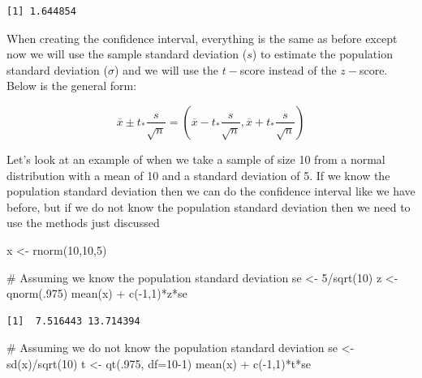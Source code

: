 \documentclass[
  letterpaper,
  DIV=11,
  numbers=noendperiod]{scrreprt}
\newenvironment{Shaded}{\begin{snugshade}}{\end{snugshade}}
\newcommand{\AttributeTok}[1]{\textcolor[rgb]{0.40,0.45,0.13}{#1}}
\newcommand{\CommentTok}[1]{\textcolor[rgb]{0.37,0.37,0.37}{#1}}
\newcommand{\DecValTok}[1]{\textcolor[rgb]{0.68,0.00,0.00}{#1}}
\newcommand{\FunctionTok}[1]{\textcolor[rgb]{0.28,0.35,0.67}{#1}}
\newcommand{\NormalTok}[1]{\textcolor[rgb]{0.00,0.23,0.31}{#1}}
\newcommand{\OtherTok}[1]{\textcolor[rgb]{0.00,0.23,0.31}{#1}}
\newcommand{\SpecialCharTok}[1]{\textcolor[rgb]{0.37,0.37,0.37}{#1}}
\begin{document}
\begin{verbatim}
[1] 1.644854
\end{verbatim}

When creating the confidence interval, everything is the same as before
except now we will use the sample standard deviation (\(s\)) to estimate
the population standard deviation (\(\sigma\)) and we will use the
\(t-\)score instead of the \(z-\)score. Below is the general form:

\[ \overline{x} \pm t_*\frac{s}{\sqrt{n}} = \left(\overline{x} - t_*\frac{s}{\sqrt{n}},\overline{x} + t_*\frac{s}{\sqrt{n}}\right) \]

Let's look at an example of when we take a sample of size 10 from a
normal distribution with a mean of 10 and a standard deviation of 5. If
we know the population standard deviation then we can do the confidence
interval like we have before, but if we do not know the population
standard deviation then we need to use the methods just discussed

\begin{Shaded}
\begin{Highlighting}[]
\NormalTok{x }\OtherTok{\textless{}{-}} \FunctionTok{rnorm}\NormalTok{(}\DecValTok{10}\NormalTok{,}\DecValTok{10}\NormalTok{,}\DecValTok{5}\NormalTok{)}

\CommentTok{\# Assuming we know the population standard deviation}
\NormalTok{se }\OtherTok{\textless{}{-}} \DecValTok{5}\SpecialCharTok{/}\FunctionTok{sqrt}\NormalTok{(}\DecValTok{10}\NormalTok{)}
\NormalTok{z }\OtherTok{\textless{}{-}} \FunctionTok{qnorm}\NormalTok{(.}\DecValTok{975}\NormalTok{)}
\FunctionTok{mean}\NormalTok{(x) }\SpecialCharTok{+} \FunctionTok{c}\NormalTok{(}\SpecialCharTok{{-}}\DecValTok{1}\NormalTok{,}\DecValTok{1}\NormalTok{)}\SpecialCharTok{*}\NormalTok{z}\SpecialCharTok{*}\NormalTok{se}
\end{Highlighting}
\end{Shaded}

\begin{verbatim}
[1]  7.516443 13.714394
\end{verbatim}

\begin{Shaded}
\begin{Highlighting}[]
\CommentTok{\# Assuming we do not know the population standard deviation}
\NormalTok{se }\OtherTok{\textless{}{-}} \FunctionTok{sd}\NormalTok{(x)}\SpecialCharTok{/}\FunctionTok{sqrt}\NormalTok{(}\DecValTok{10}\NormalTok{)}
\NormalTok{t }\OtherTok{\textless{}{-}} \FunctionTok{qt}\NormalTok{(.}\DecValTok{975}\NormalTok{, }\AttributeTok{df=}\DecValTok{10{-}1}\NormalTok{)}
\FunctionTok{mean}\NormalTok{(x) }\SpecialCharTok{+} \FunctionTok{c}\NormalTok{(}\SpecialCharTok{{-}}\DecValTok{1}\NormalTok{,}\DecValTok{1}\NormalTok{)}\SpecialCharTok{*}\NormalTok{t}\SpecialCharTok{*}\NormalTok{se}
\end{Highlighting}
\end{Shaded}
\end{document}
